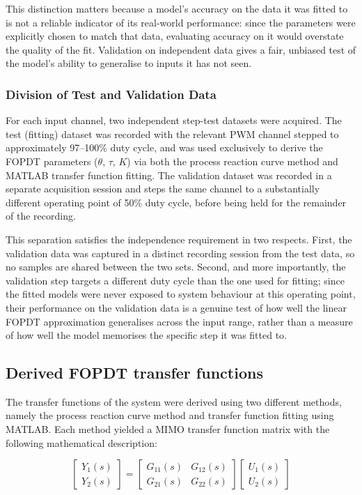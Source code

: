 This distinction matters because a model's accuracy on the data it was
fitted to is not a reliable indicator of its real-world performance: since
the parameters were explicitly chosen to match that data, evaluating
accuracy on it would overstate the quality of the fit. Validation on
independent data gives a fair, unbiased test of the model's ability to
generalise to inputs it has not seen.

\subsubsection*{Division of Test and Validation Data}

For each input channel, two independent step-test datasets were acquired.
The test (fitting) dataset was recorded with the relevant PWM channel
stepped to approximately 97--100\% duty cycle, and was used exclusively to
derive the FOPDT parameters ($\theta$, $\tau$, $K$) via both the process
reaction curve method and MATLAB transfer function fitting. The validation
dataset was recorded in a separate acquisition session and steps the same
channel to a substantially different operating point of 50\% duty cycle,
before being held for the remainder of the recording.

This separation satisfies the independence requirement in two respects.
First, the validation data was captured in a distinct recording session
from the test data, so no samples are shared between the two sets.
Second, and more importantly, the validation step targets a different duty
cycle than the one used for fitting; since the fitted models were never
exposed to system behaviour at this operating point, their performance on
the validation data is a genuine test of how well the linear FOPDT
approximation generalises across the input range, rather than a measure of
how well the model memorises the specific step it was fitted to.

\subsection{Derived FOPDT transfer functions}
The transfer functions of the system were derived using two different methods, namely the process reaction curve method and transfer function fitting using MATLAB. Each method
yielded a MIMO transfer function matrix with the following mathematical description:

\begin{equation}
    \begin{bmatrix}
        Y_1(s) \\
        Y_2(s)
    \end{bmatrix}
    =
    \begin{bmatrix}
        G_{11}(s) & G_{12}(s) \\
        G_{21}(s) & G_{22}(s)
    \end{bmatrix}
    \begin{bmatrix}
        U_1(s) \\
        U_2(s)
    \end{bmatrix}
\end{equation}

